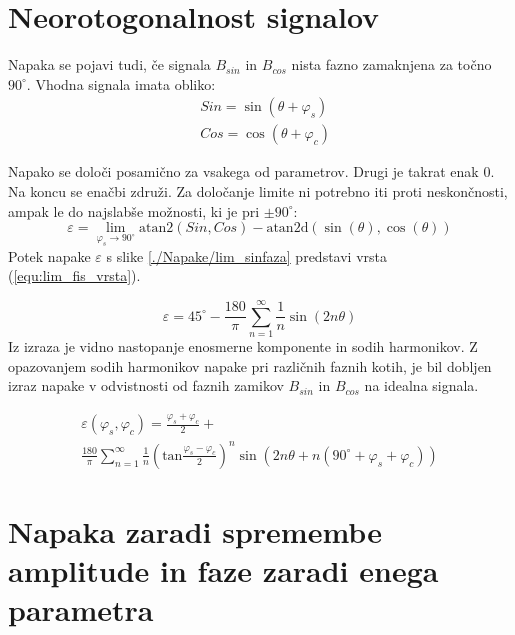 \section{Neorotogonalnost signalov}

Napaka se pojavi tudi, če signala $B_{sin}$ in $B_{cos}$ nista fazno zamaknjena za točno $90^\circ$.
Vhodna signala imata obliko:
\begin{eqnarray}
\label{equ:def_sin_fis}
&Sin = \sin(\theta + \varphi_{s})\\
\label{equ:def_cos_fis}
&Cos =\cos(\theta+\varphi_{c})
\end{eqnarray}

Napako se določi posamično za vsakega od parametrov. Drugi je takrat enak 0. Na koncu se enačbi združi. Za določanje limite ni potrebno iti proti neskončnosti, ampak le do najslabše možnosti, ki je pri $\pm 90^\circ$:
\begin{equation}
\label{equ:fis_lim}
\varepsilon = \lim_{\varphi_{s} \rightarrow 90^\circ} \mathrm{atan2}(Sin ,Cos)- \mathrm{atan2d}(\sin(\theta),\cos(\theta))
\end{equation}
Potek napake $\varepsilon$ s slike \ref{./Napake/lim_sinfaza} predstavi vrsta (\ref{equ:lim_fis_vrsta}).

\begin{equation}
\label{equ:lim_fis_vrsta}
\varepsilon = 45^\circ - \frac{180}{\pi}\sum_{n=1}^{\infty}\frac{1}{n} \sin (2n \theta)
\end{equation} 
Iz  izraza je vidno nastopanje enosmerne komponente in sodih harmonikov. Z opazovanjem sodih harmonikov napake pri različnih faznih kotih, je bil dobljen izraz napake v odvistnosti od faznih zamikov $B_{sin}$ in $B_{cos}$ na idealna signala.

\begin{multline}
\label{equ:fis_err}
\varepsilon(\varphi_{s},\varphi_{c}) = \frac{\varphi_{s}+\varphi_{c}}{2}+\\ \frac{180}{\pi}\sum_{n=1}^{\infty}\frac{1}{n} (\mathrm{tan}\frac{\varphi_{s}-\varphi_{c}}{2})^n \sin (2n \theta+n(90^\circ +\varphi_{s}+\varphi_{c}))
\end{multline}

\section{Napaka zaradi spremembe amplitude in faze zaradi enega parametra}

